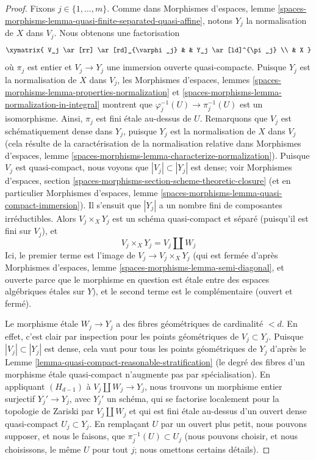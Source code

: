 \begin{proof}
\medskip\noindent
Fixons $j \in \{1, \ldots, m\}$.
Comme dans Morphismes d'espaces, lemme
\ref{spaces-morphisms-lemma-quasi-finite-separated-quasi-affine},
notons $Y_j$ la normalisation de $X$ dans $V_j$. Nous obtenons une
factorisation
$$
\xymatrix{
V_j \ar[rr] \ar[rd]_{\varphi_j} & & Y_j \ar[ld]^{\pi_j} \\
& X
}
$$
où $\pi_j$ est entier et $V_j \to Y_j$ une immersion ouverte
quasi-compacte. Puisque $Y_j$ est la normalisation de $X$ dans $V_j$, les
Morphismes d'espaces, lemmes
\ref{spaces-morphisms-lemma-properties-normalization} et
\ref{spaces-morphisms-lemma-normalization-in-integral}
montrent que $\varphi_j^{-1}(U) \to \pi_j^{-1}(U)$ est un isomorphisme.
Ainsi, $\pi_j$ est fini étale au-dessus de $U$. Remarquons que $V_j$ est
schématiquement dense dans $Y_j$, puisque $Y_j$ est la normalisation de $X$
dans $V_j$ (cela résulte de la caractérisation de la normalisation relative
dans Morphismes d'espaces, lemme
\ref{spaces-morphisms-lemma-characterize-normalization}). Puisque $V_j$ est
quasi-compact, nous voyons que $|V_j| \subset |Y_j|$ est dense; voir
Morphismes d'espaces, section
\ref{spaces-morphisms-section-scheme-theoretic-closure}
(et en particulier Morphismes d'espaces, lemme
\ref{spaces-morphisms-lemma-quasi-compact-immersion}).
Il s'ensuit que $|Y_j|$ a un nombre fini de composantes irréductibles.
Alors $V_j \times_X Y_j$ est un schéma quasi-compact et séparé
(puisqu'il est fini sur $V_j$), et
$$
V_j \times_X Y_j = V_j \amalg W_j
$$
Ici, le premier terme est l'image de $V_j \to V_j \times_X Y_j$
(qui est fermée d'après
Morphismes d'espaces, lemme \ref{spaces-morphisms-lemma-semi-diagonal},
et ouverte parce que le morphisme en question est étale entre des espaces
algébriques étales sur $Y$), et le second terme est le complémentaire
(ouvert et fermé).

\medskip\noindent
Le morphisme étale $W_j \to Y_j$ a des fibres géométriques de cardinalité
$< d$. En effet, c'est clair par inspection pour les points géométriques de
$V_j \subset Y_j$. Puisque $|V_j| \subset |Y_j|$ est dense, cela vaut pour
tous les points géométriques de $Y_j$ d'après le
Lemme \ref{lemma-quasi-compact-reasonable-stratification}
(le degré des fibres d'un morphisme étale quasi-compact n'augmente pas par
spécialisation). En appliquant $(H_{d - 1})$ à
$V_j \amalg W_j \to Y_j$, nous trouvons un morphisme entier surjectif
$Y_j' \to Y_j$, avec $Y_j'$ un schéma, qui se factorise localement pour la
topologie de Zariski par $V_j \amalg W_j$ et qui est fini étale au-dessus
d'un ouvert dense quasi-compact $U_j \subset Y_j$. En remplaçant $U$ par un
ouvert plus petit, nous pouvons supposer, et nous le faisons, que
$\pi_j^{-1}(U) \subset U_j$ (nous pouvons choisir, et nous choisissons, le
même $U$ pour tout $j$; nous omettons certains détails).


\end{proof}
